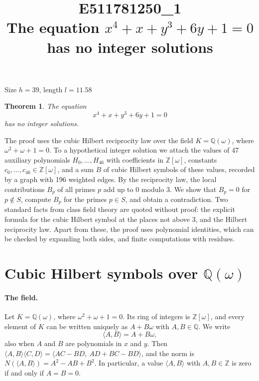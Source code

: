 \documentclass[11pt]{article}
\title{\textbf{E511781250\_1}\\[4pt] {\Large The equation $x^{4}+x+y^{3}+6y+1=0$ has no integer solutions}}
\author{}
\date{}
\newtheorem{theorem}{Theorem}
\newcommand{\Z}{\mathbb{Z}}
\newcommand{\Q}{\mathbb{Q}}
\begin{document}
\maketitle
\vspace{-8ex}
\begin{center}
Size $h=39$, length $l=11.58$
\end{center}

\begin{theorem}\label{thm:main}
The equation
\begin{equation}\label{eq:main}
x^{4}+x+y^{3}+6y+1=0
\end{equation}
has no integer solutions.
\end{theorem}

The proof uses the cubic Hilbert reciprocity law over the field $K=\Q(\omega)$, where $\omega^2+\omega+1=0$. To a hypothetical integer solution we attach the values of 47 auxiliary polynomials $H_0,\dots,H_{46}$ with coefficients in $\Z[\omega]$, constants $c_0,\dots,c_{46}\in\Z[\omega]$, and a sum $B$ of cubic Hilbert symbols of these values, recorded by a graph with 196 weighted edges. By the reciprocity law, the local contributions $B_p$ of all primes $p$ add up to $0$ modulo $3$. We show that $B_p=0$ for $p\notin S$, compute $B_p$ for the primes $p\in S$, and obtain a contradiction. Two standard facts from class field theory are quoted without proof: the explicit formula for the cubic Hilbert symbol at the places not above $3$, and the Hilbert reciprocity law. Apart from these, the proof uses polynomial identities, which can be checked by expanding both sides, and finite computations with residues.


\section{\texorpdfstring{Cubic Hilbert symbols over $\Q(\omega)$}{Cubic Hilbert symbols over Q(w)}}\label{sec:symbols}

\paragraph{The field.} Let $K=\Q(\omega)$, where $\omega^2+\omega+1=0$. Its ring of integers is $\Z[\omega]$, and every element of $K$ can be written uniquely as $A+B\omega$ with $A,B\in\Q$. We write
\[
\langle A,B\rangle=A+B\omega,
\]
also when $A$ and $B$ are polynomials in $x$ and $y$. Then $\langle A,B\rangle\langle C,D\rangle=\langle AC-BD,\ AD+BC-BD\rangle$, and the norm is $N(\langle A,B\rangle)=A^2-AB+B^2$. In particular, a value $\langle A,B\rangle$ with $A,B\in\Z$ is zero if and only if $A=B=0$.
\end{document}
